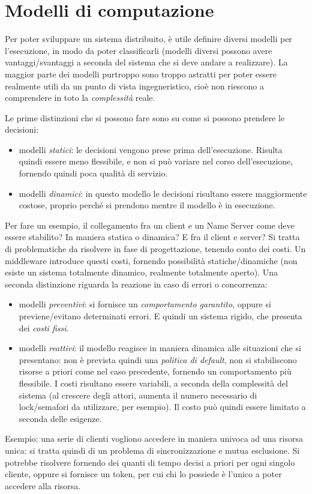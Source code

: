 \section{Modelli di computazione}
Per poter sviluppare un sistema distribuito, è utile definire diversi modelli per l'esecuzione, in modo da poter
classificarli (modelli diversi possono avere vantaggi/svantaggi a seconda del sistema che si deve andare a realizzare).
La maggior parte dei modelli purtroppo sono troppo astratti per poter essere realmente utili da un punto di vista
ingegneristico, cioè non riescono a comprendere in toto la \textit{complessità} reale.

Le prime distinzioni che si possono fare sono su come si possono prendere le decisioni:
\begin{itemize}
 \item modelli \textit{statici}: le decisioni vengono prese prima dell'esecuzione. Risulta quindi essere meno
flessibile, e non si può variare nel corso dell'esecuzione, fornendo quindi poca qualità di servizio.
\item modelli \textit{dinamici}: in questo modello le decisioni risultano essere maggiormente costose, proprio perché 
si prendono mentre il modello è in esecuzione.
\end{itemize}
Per fare un esempio, il collegamento fra un client e un Name Server come deve essere stabilito? In maniera statica o
dinamica? E fra il client e server? Si tratta di problematiche da risolvere in fase di progettazione, tenendo conto 
dei costi. Un middleware introduce questi costi, fornendo possibilità statiche/dinamiche (non esiste un sistema
totalmente dinamico, realmente totalmente aperto).
Una seconda distinzione riguarda la reazione in caso di errori o concorrenza:
\begin{itemize}
 \item modelli \textit{preventivi}: si fornisce un \textit{comportamento garantito}, oppure si previene/evitano
determinati errori. E quindi un sistema rigido, che presenta dei \textit{costi fissi}.
\item modelli \textit{reattivi}: il modello reagisce in maniera dinamica alle situazioni che si presentano: non è
prevista quindi una \textit{politica di default}, non si stabiliscono risorse a priori come nel caso precedente,
fornendo un comportamento più flessibile. I costi risultano essere variabili, a seconda della complessità del sistema
(al crescere degli attori, aumenta il numero necessario di lock/semafori da utilizzare, per esempio). Il costo può
quindi essere limitato a seconda delle esigenze.
\end{itemize}
Esempio: una serie di clienti vogliono accedere in maniera univoca ad una risorsa unica: si tratta quindi di un problema
di sincronizzazione e mutua esclusione. Si potrebbe risolvere fornendo dei quanti di tempo decisi a priori per ogni
singolo cliente, oppure si fornisce un token, per cui chi lo possiede è l'unico a poter accedere alla risorsa.

